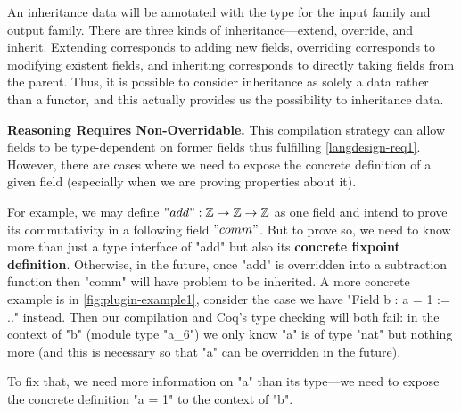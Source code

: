 An inheritance data 
will be annotated with the type for the input family
and output family. There are three kinds of inheritance---extend,
override, and inherit. Extending corresponds to adding new fields,
overriding corresponds to modifying existent fields, and inheriting
corresponds to directly taking fields from the parent.
Thus, it is possible to consider inheritance as solely a data rather
than a functor, and this actually provides us the possibility to
 inheritance data. 




\textbf{Reasoning Requires Non-Overridable.}
This compilation strategy
can allow fields to be type-dependent on former fields thus fulfilling
\ref{langdesign-req1}. However, there are cases where we need to expose
the concrete definition of a given field (especially when we are proving
properties about it).

For example, we may
define $"add" : \mathbb{Z} \to \mathbb{Z} \to \mathbb{Z}$ as one field
and intend to prove its commutativity in a following field $"comm"$.
But to prove so, we need to know more than just a type interface of
"add" but also its \textbf{concrete fixpoint definition}. Otherwise, in the
future, once "add" is overridden into a subtraction function then
"comm" will have problem to be inherited.
A more concrete example is in \cref{fig:plugin-example1}, consider the
case we have "Field b : a = 1 := .." instead. Then our
compilation and Coq's type checking will both fail: in the context of
"b" (module type "a_6") we only know "a" is of type "nat" but nothing
more (and this is necessary so that "a" can be overridden in the
future).

To fix that, we need more information on "a" than its type---we
need to expose the concrete definition "a = 1" to the context of "b".

